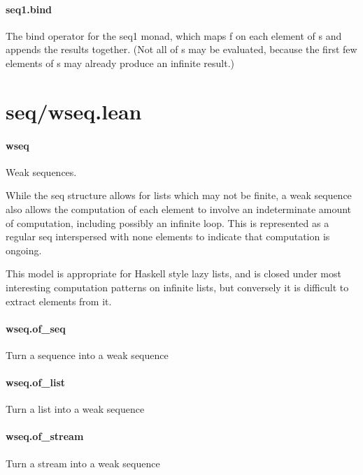 \documentclass{article}
\begin{document}
\paragraph{seq1.bind}
\par
The 
\colorbox[RGB]{253,246,227}{{{{\color[RGB]{101, 123, 131} bind }}}} operator for the 
\colorbox[RGB]{253,246,227}{{{{\color[RGB]{101, 123, 131} seq1 }}}} monad,
which maps 
\colorbox[RGB]{253,246,227}{{{{\color[RGB]{101, 123, 131} f }}}} on each element of 
\colorbox[RGB]{253,246,227}{{{{\color[RGB]{101, 123, 131} s }}}} and appends the results together.
(Not all of 
\colorbox[RGB]{253,246,227}{{{{\color[RGB]{101, 123, 131} s }}}} may be evaluated, because the first few elements of 
\colorbox[RGB]{253,246,227}{{{{\color[RGB]{101, 123, 131} s }}}}may already produce an infinite result.)
\section{seq/wseq.lean}\paragraph{wseq}
\par
Weak sequences.
\par
While the 
\colorbox[RGB]{253,246,227}{{{{\color[RGB]{101, 123, 131} seq }}}} structure allows for lists which may not be finite,
a weak sequence also allows the computation of each element to
involve an indeterminate amount of computation, including possibly
an infinite loop. This is represented as a regular 
\colorbox[RGB]{253,246,227}{{{{\color[RGB]{101, 123, 131} seq }}}} interspersed
with 
\colorbox[RGB]{253,246,227}{{{{\color[RGB]{101, 123, 131} none }}}} elements to indicate that computation is ongoing.
\par
This model is appropriate for Haskell style lazy lists, and is closed
under most interesting computation patterns on infinite lists,
but conversely it is difficult to extract elements from it.
\paragraph{wseq.of\_seq}
\par
Turn a sequence into a weak sequence
\paragraph{wseq.of\_list}
\par
Turn a list into a weak sequence
\paragraph{wseq.of\_stream}
\par
Turn a stream into a weak sequence
\end{document}
